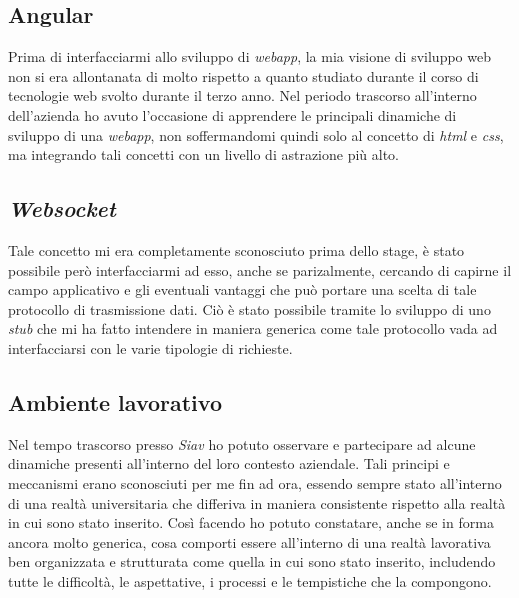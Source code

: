 \subsection{Angular}
Prima di interfacciarmi allo sviluppo di \textit{webapp}, la mia visione di sviluppo web non si era allontanata di molto rispetto a quanto studiato durante il corso di tecnologie web svolto durante il terzo anno. Nel periodo trascorso all'interno dell'azienda ho avuto l'occasione di apprendere le principali dinamiche di sviluppo di una \textit{webapp}, non soffermandomi quindi solo al concetto di \textit{html} e \textit{css}, ma integrando tali concetti con un livello di astrazione più alto.
\subsection{\textit{Websocket}}
Tale concetto mi era completamente sconosciuto prima dello stage, è stato possibile però interfacciarmi ad esso, anche se parizalmente, cercando di capirne il campo applicativo e gli eventuali vantaggi che può portare una scelta di tale protocollo di trasmissione dati. Ciò è stato possibile tramite lo sviluppo di uno \textit{stub} che mi ha fatto intendere in maniera generica come tale protocollo vada ad interfacciarsi con le varie tipologie di richieste.
\subsection{Ambiente lavorativo}
Nel tempo trascorso presso \textit{Siav} ho potuto osservare e partecipare ad alcune dinamiche presenti all'interno del loro contesto aziendale. Tali principi e meccanismi erano sconosciuti per me fin ad ora, essendo sempre stato all'interno di una realtà universitaria che differiva in maniera consistente rispetto alla realtà in cui sono stato inserito. Così facendo ho potuto constatare, anche se in forma ancora molto generica, cosa comporti essere all'interno di una realtà lavorativa ben organizzata e strutturata come quella in cui sono stato inserito, includendo tutte le difficoltà, le aspettative, i processi e le tempistiche che la compongono.
